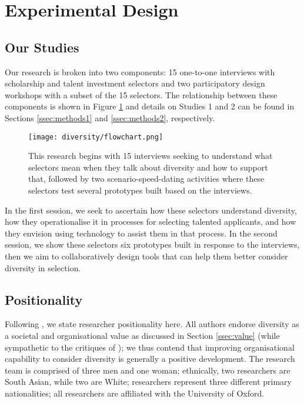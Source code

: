 \section{Experimental Design}\label{sec:methods}
\subsection{Our Studies}
Our research is broken into two components: 15 one-to-one interviews with scholarship and talent investment selectors and two participatory design workshops with a subset of the 15 selectors. The relationship between these components is shown in Figure \ref{fig:flowchart} and details on Studies 1 and 2 can be found in Sections \ref{ssec:methods1} and \ref{ssec:methods2}, respectively.

\begin{figure}[htbp]
    \centering
    \texttt{[image: diversity/flowchart.png]}
    \caption{This research begins with 15 interviews seeking to understand what selectors mean when they talk about diversity and how to support that, followed by two scenario-speed-dating activities where these selectors test several prototypes built based on the interviews.}
    \label{fig:flowchart}
\end{figure}

In the first session, we seek to ascertain how these selectors understand diversity, how they operationalise it in processes for selecting talented applicants, and how they envision using technology to assist them in that process. In the second session, we show these selectors six prototypes built in response to the interviews, then we aim to collaboratively design tools that can help them better consider diversity in selection.

\subsection{Positionality}
Following \textcite{venn-wycherley_realities_2024}, we state researcher positionality here. All authors endorse diversity as a societal and organisational value as discussed in Section \ref{ssec:value} (while sympathetic to the critiques of \textcite{Ahmed_2012,Warikoo_2019}); we thus contend that improving organisational capability to consider diversity is generally a positive development. The research team is comprised of three men and one woman; ethnically, two researchers are South Asian, while two are White; researchers represent three different primary nationalities; all researchers are affiliated with the University of Oxford.

